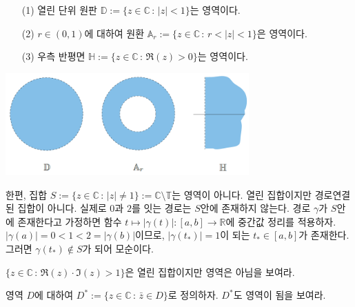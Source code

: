 \begin{saltexample}[label=example-1-3]{}{}

\begin{itemize}
\item[(1)] 열린 단위 원판 $\mathbb D := \{ z\in\mathbb C\,:\, |z|<1 \}$는 영역이다.
\item[(2)] $r\in (0,1)$에 대하여 원환 $\mathbb A_r := \{ z\in\mathbb C\,:\, r<|z|<1\}$은 영역이다.
\item[(3)] 우측 반평면 $\mathbb H := \{ z\in \mathbb C \,:\, \Re(z)>0\}$는 영역이다.
\end{itemize}

\begin{center}
\includegraphics[width=0.7\textwidth]{./SaltChapter/figs/fig-1-12}
\end{center}
\label{fig-1-12}
\end{saltexample}

한편, 집합 $S:=\{z\in\mathbb C \,:\, |z|\ne 1\} := \mathbb C\setminus \mathbb T$는 
영역이 아니다. 열린 집합이지만 경로연결된 집합이 아니다.
실제로 $0$과 $2$를 잇는 경로는 $S$안에 존재하지 않는다.
경로 $\gamma$가 $S$안에 존재한다고 가정하면
함수 $t\mapsto |\gamma(t)| : [a,b] \to \mathbb R$에
중간값 정리를 적용하자.
$|\gamma(a)| = 0 < 1<2 = |\gamma(b)|$이므로,
$|\gamma(t_*)|=1$이 되는 $t_*\in [a,b]$가 존재한다.
그러면 $\gamma(t_*)\not\in S$가 되어 모순이다.

\begin{salt_exercise} \label{ex-1-29}
$\{z\in \mathbb C \,:\, \Re(z) \cdot \Im(z) >1\}$은 열린 집합이지만
영역은 아님을 보여라.
\end{salt_exercise}

\begin{salt_exercise} \label{ex-1-30}
영역 $D$에 대하여
$D^*:= \{z\in\mathbb C\,:\, \bar z \in D\}$로 정의하자.
$D^*$도 영역이 됨을 보여라.
\end{salt_exercise}


